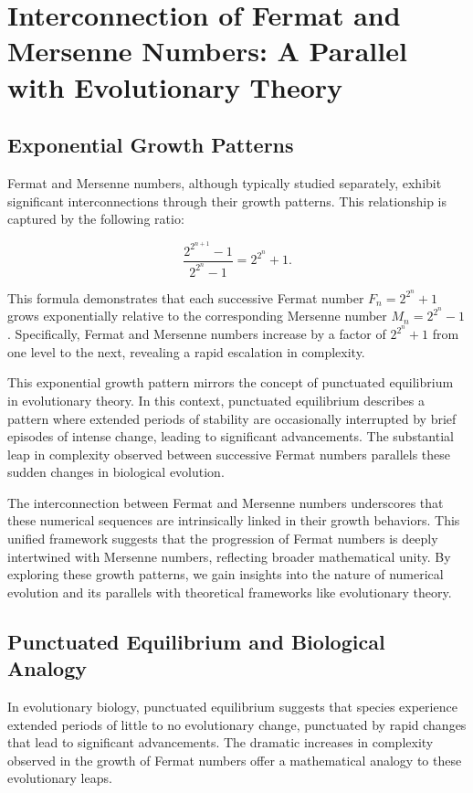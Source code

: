 \documentclass[12pt]{article}
\begin{document}
\section{Interconnection of Fermat and Mersenne Numbers: A Parallel with Evolutionary Theory}

\subsection{Exponential Growth Patterns}

Fermat and Mersenne numbers, although typically studied separately, exhibit significant interconnections through their growth patterns. This relationship is captured by the following ratio:

\[
\frac{2^{2^{n+1}} - 1}{2^{2^n} - 1} = 2^{2^n} + 1.
\]

This formula demonstrates that each successive Fermat number \( F_n = 2^{2^n} + 1 \) grows exponentially relative to the corresponding Mersenne number \( M_n = 2^{2^n} - 1 \). Specifically, Fermat and Mersenne numbers increase by a factor of \( 2^{2^n} + 1 \) from one level to the next, revealing a rapid escalation in complexity.

This exponential growth pattern mirrors the concept of punctuated equilibrium in evolutionary theory. In this context, punctuated equilibrium describes a pattern where extended periods of stability are occasionally interrupted by brief episodes of intense change, leading to significant advancements. The substantial leap in complexity observed between successive Fermat numbers parallels these sudden changes in biological evolution.

The interconnection between Fermat and Mersenne numbers underscores that these numerical sequences are intrinsically linked in their growth behaviors. This unified framework suggests that the progression of Fermat numbers is deeply intertwined with Mersenne numbers, reflecting broader mathematical unity. By exploring these growth patterns, we gain insights into the nature of numerical evolution and its parallels with theoretical frameworks like evolutionary theory.

\subsection{Punctuated Equilibrium and Biological Analogy}

In evolutionary biology, punctuated equilibrium suggests that species experience extended periods of little to no evolutionary change, punctuated by rapid changes that lead to significant advancements. The dramatic increases in complexity observed in the growth of Fermat numbers offer a mathematical analogy to these evolutionary leaps.
\end{document}
